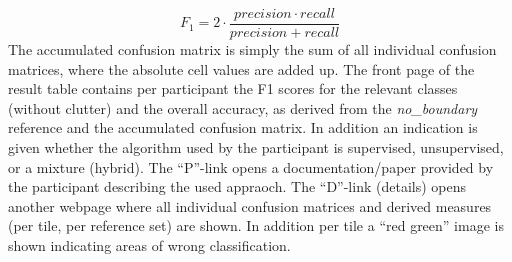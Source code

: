 \begin{equation*}
    F_1 = 2 \cdot \frac{precision \cdot recall}{precision + recall}
\end{equation*}
The accumulated confusion matrix is simply the sum of all individual confusion
matrices, where the absolute cell values are added up. The front page of the
result table contains per participant the F1 scores for the relevant classes
(without clutter) and the overall accuracy, as derived from the
\emph{no\_boundary} reference and the accumulated confusion matrix. In
addition an indication is given whether the algorithm used by the participant
is supervised, unsupervised, or a mixture (hybrid). The ``P''-link opens a
documentation/paper provided by the participant describing the used appraoch.
The ``D''-link (details) opens another webpage where all individual confusion
matrices and derived measures (per tile, per reference set) are shown. In
addition per tile a ``red green'' image is shown indicating areas of wrong
classification.
